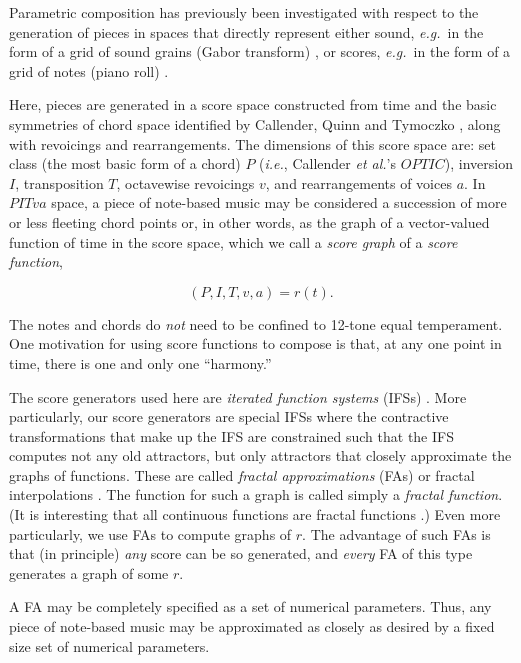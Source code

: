 \documentclass[english,11pt,letterpaper,onecolumn]{scrartcl}
\numberwithin{equation}{section}
\begin{document}
Parametric composition has previously been investigated with respect to the
generation of pieces in spaces that directly represent either sound,
\textit{e.g.}\ in the form of a grid of sound grains (Gabor transform)
\cite{obsessed}, or scores, \textit{e.g.}\ in the form of a grid of notes
(piano roll) \cite{ifsmusic}.

Here, pieces are generated in a score space constructed from time and the basic
symmetries of chord space identified by Callender, Quinn and Tymoczko
\cite{callender:346}, along with revoicings and rearrangements. The dimensions
of this score space are: set class (the most basic form of a  chord) $P$
(\textit{i.e.}, Callender \textit{et al.}'s $OPTIC$), inversion $I$,
transposition $T$, octavewise revoicings $v$, and rearrangements of voices $a$.
In $PITva$ space, a piece of note-based music may be considered a succession of
more or less fleeting chord points or, in other words, as the graph of a
vector-valued function of time in the score space, which we call a
\textit{score graph} of a \textit{score function},

$$(P, I, T, v, a) = r(t).$$

\noindent The notes and chords do \textit{not} need to be confined to 12-tone
equal temperament. One motivation for using score functions to compose is that,
at any one point in time, there is one and only one ``harmony.''

The score generators used here are \textit{iterated function systems} (IFSs)
\cite{barnsley1985iterated, 10.2307/24893080, fractalseverywhere}. More
particularly, our score generators are special IFSs where the contractive
transformations that make up the IFS are constrained such that the IFS computes
not any old attractors, but only attractors that closely approximate the graphs
of functions. These are called \textit{fractal approximations} (FAs) or fractal
interpolations \cite{Barnsley1986, fractalseverywhere, navascues2014fractal}.
The function for such a graph is called simply a \textit{fractal function}. (It
is interesting that all continuous functions are fractal functions
\cite{2016arXiv161001369B}.) Even more particularly, we use FAs to compute
graphs of $r$. The advantage of such FAs is that (in principle) \textit{any}
score can be so generated, and \textit{every} FA of this type generates a graph
of some $r$.

A FA may be completely specified as a set of numerical parameters. Thus, any
piece of note-based music may be approximated as closely as desired by a fixed
size set of numerical parameters.
\end{document}
